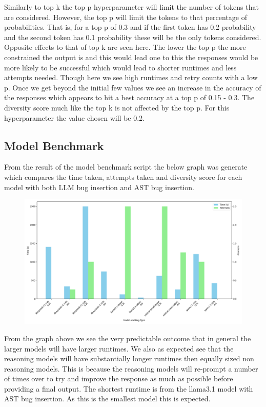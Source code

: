 \documentclass[12pt]{extarticle}
\begin{document}
Similarly to top k the top p hyperparameter will limit the number of tokens that are considered. However, the top p will limit the tokens to that percentage of probabilities. That is, for a top p of 0.3 and if the first token has 0.2 probability and the second token has 0.1 probability these will be the only tokens considered. Opposite effects to that of top k are seen here. The lower the top p the more constrained the output is and this would lead one to this the responses would be more likely to be successful which would lead to shorter runtimes and less attempts needed. Though here we see high runtimes and retry counts with a low p. Once we get beyond the initial few values we see an increase in the accuracy of the responses which appears to hit a best accuracy at a top p of 0.15 - 0.3. The diversity score much like the top k is not affected by the top p. For this hyperparameter the value chosen will be 0.2.


\subsection{Model Benchmark}

From the result of the model benchmark script the below graph was generate which compares the time taken, attempts taken and diversity score for each model with both LLM bug insertion and AST bug insertion.

\begin{figure}[H]
\centering
\includegraphics[width=0.7\linewidth]{Images/Model_Comparison_Fibbonaci.png}
\label{fig:Model_Benchmark}
\end{figure}

From the graph above we see the very predictable outcome that in general the larger models will have larger runtimes. We also as expected see that the reasoning models will have substantially longer runtimes then equally sized non reasoning models. This is because the reasoning models will re-prompt a number of times over to try and improve the response as much as possible before providing a final output. The shortest runtime is from the llama3.1 model with AST bug insertion. As this is the smallest model this is expected. 
\end{document}
